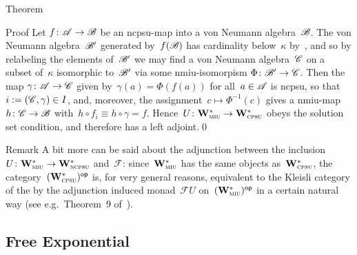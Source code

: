 \documentclass[a]{subfiles}
\begin{document}
\begin{parsec}
\begin{point}{Theorem}
\begin{point}{Proof}
Let $f\colon \mathscr{A}\to\mathscr{B}$
be an ncpsu-map
into a von Neumann algebra~$\mathscr{B}$.
The von Neumann algebra~$\mathscr{B}'$ generated by~$f(\mathscr{B})$
has cardinality below~$\kappa$
by~,
and so by relabeling the elements of~$\mathscr{B}'$
we may find a von Neumann algebra~$\mathscr{C}$
on a subset of~$\kappa$
isomorphic to~$\mathscr{B}'$
via some nmiu-isomorpism $\Phi\colon \mathscr{B}'\to\mathscr{C}$.
Then the map $\gamma\colon \mathscr{A}\to \mathscr{C}$
given by~$\gamma(a)=\Phi(f(a))$ for all~$a\in\mathscr{A}$
is ncpsu,
so that~$i:=(\mathscr{C},\gamma)\in I$,
and, moreover,
the assignment~$c\mapsto \Phi^{-1}(c)$
gives a nmiu-map $h\colon \mathscr{C}\to \mathscr{B}$
with~$h\circ f_i \equiv h\circ \gamma=f$.
Hence~$U\colon \mathbf{W}^*_{\text{\textsc{miu}}}\to\mathbf{W}^*_{\text{\textsc{cpsu}}}$
obeys the solution set condition,
and therefore has a left adjoint.\qed
\end{point}
\begin{point}{Remark}%
A bit more can be said
about the adjunction between the inclusion~$U\colon \mathbf{W}^*_{\text{\textsc{miu}}}\to\mathbf{W}^*_{\text{\textsc{ncpsu}}}$
and~$\mathcal{F}$:
since~$\mathbf{W}^*_{\text{\textsc{miu}}}$ has the same objects as~$\mathbf{W}^*_{\text{\textsc{cpsu}}}$,
the category~${(\mathbf{W}^*_{\text{\textsc{cpsu}}})}{^{\mathsf{op}}}$
is, for very general reasons, equivalent
to the Kleisli category
of the by the adjunction induced  monad~$\mathcal{F}U$ 
on~${(\mathbf{W}^*_{\text{\textsc{miu}}})}{^{\mathsf{op}}}$
in a certain natural way
(see e.g.~Theorem~9 of~\cite{qpakm}).
\end{point}
\end{point}
\end{parsec}
\subsection{Free Exponential}
	
\end{document}
